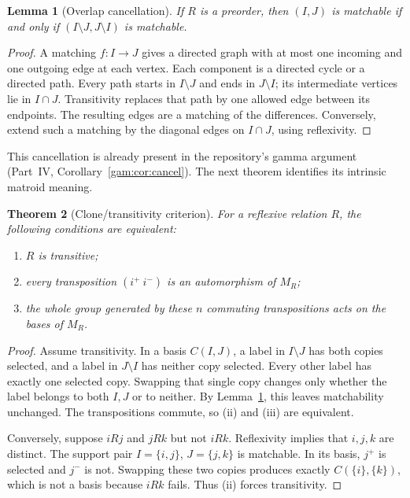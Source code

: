\documentclass[11pt]{article}
\numberwithin{equation}{section}
\newtheorem{theorem}{Theorem}[section]
\newtheorem{lemma}[theorem]{Lemma}
\theoremstyle{definition}
\begin{document}
\begin{lemma}[Overlap cancellation]\label{mat:lem:cancellation}
If $R$ is a preorder, then $(I,J)$ is matchable if and only if
$(I\setminus J,J\setminus I)$ is matchable.
\end{lemma}
\begin{proof}
A matching $f:I\to J$ gives a directed graph with at most one incoming and
one outgoing edge at each vertex. Each component is a directed cycle or a
directed path. Every path starts in $I\setminus J$ and ends in
$J\setminus I$; its intermediate vertices lie in $I\cap J$. Transitivity
replaces that path by one allowed edge between its endpoints. The resulting
edges are a matching of the differences. Conversely, extend such a matching
by the diagonal edges on $I\cap J$, using reflexivity.
\end{proof}

This cancellation is already present in the repository's gamma argument (Part~IV, Corollary~\ref{gam:cor:cancel}).
The next theorem identifies its intrinsic matroid meaning.

\begin{theorem}[Clone/transitivity criterion]\label{mat:thm:clone-trans}
For a reflexive relation $R$, the following conditions are equivalent:
\begin{enumerate}[label=(\roman*)]
\item $R$ is transitive;
\item every transposition $(i^+\ i^-)$ is an automorphism of $M_R$;
\item the whole group generated by these $n$ commuting transpositions acts
on the bases of $M_R$.
\end{enumerate}
\end{theorem}
\begin{proof}
Assume transitivity. In a basis $C(I,J)$, a label in $I\setminus J$ has both
copies selected, and a label in $J\setminus I$ has neither copy selected.
Every other label has exactly one selected copy. Swapping that single copy
changes only whether the label belongs to both $I,J$ or to neither. By
Lemma~\ref{mat:lem:cancellation}, this leaves matchability unchanged. The
transpositions commute, so (ii) and (iii) are equivalent.

Conversely, suppose $iRj$ and $jRk$ but not $iRk$. Reflexivity implies that
$i,j,k$ are distinct. The support pair
$I=\{i,j\}$, $J=\{j,k\}$ is matchable. In its basis, $j^+$ is selected and
$j^-$ is not. Swapping these two copies produces exactly
$C(\{i\},\{k\})$, which is not a basis because $iRk$ fails. Thus (ii)
forces transitivity.
\end{proof}
\end{document}

